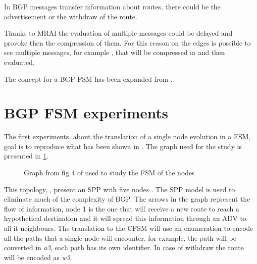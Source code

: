 In \ac{BGP} messages transfer information about routes, there could be the advertisement
or the withdraw of the route.

Thanks to \ac{MRAI} the evaluation of multiple messages could be delayed and
provoke then the compression of them.
For this reason on the edges is possible to see multiple messages, for example 
, that will be compressed in  and then evaluated.

The concept for a \ac{BGP} \ac{FSM} has been expanded from \cite{griffinFSM}.


\section{BGP FSM experiments}
\label{sec:bgp_fsm_experiments}

The first experiments, about the translation of a single node evolution in a
\ac{FSM}, goal is to reproduce what has been shown in \cite{griffinFSM}.
The graph used for the study is presented in \cref{fig:griffin_fig_4}.

\begin{figure}[h]                                                               
    \begin{center}                                                              
        
    \end{center}                                                                
	\caption{Graph from fig 4 of \cite{griffinFSM} used to study the \ac{FSM}
		of the nodes}                                
    \label{fig:griffin_fig_4}                                                   
\end{figure}

This topology, , present an \ac{SPP} with five nodes \cite{griffin2002stable}. 
The \ac{SPP} model is used to eliminate much of the complexity of \ac{BGP}.
The arrows in the graph represent the flow of information, node \num{1} is the one
that will receive a new route to reach a hypothetical destination and it will 
spread this information through an \ac{ADV} to all it neighbours.
The translation to the \ac{CFSM} will use an enumeration to encode all the
paths that a single node will encounter, for example, the path  will
be converted in \textit{a3}, each path has its own identifier.
In case of withdraw the route will be encoded as \textit{w3}.

